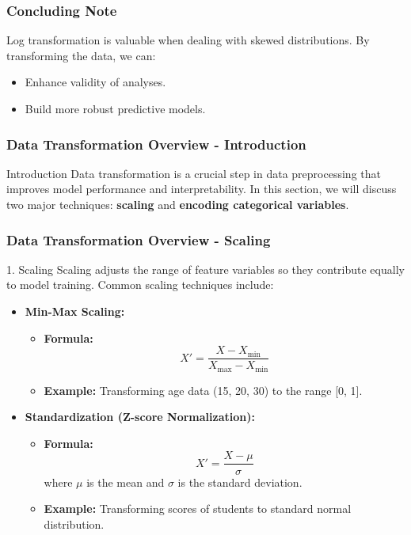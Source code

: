 \documentclass[aspectratio=169]{beamer}
\begin{document}
\begin{frame}[fragile]
  \frametitle{Concluding Note}
  Log transformation is valuable when dealing with skewed distributions. By transforming the data, we can:
  \begin{itemize}
    \item Enhance validity of analyses.
    \item Build more robust predictive models.
  \end{itemize}
\end{frame}

\begin{frame}[fragile]
    \frametitle{Data Transformation Overview - Introduction}
    \begin{block}{Introduction}
        Data transformation is a crucial step in data preprocessing that improves model performance and interpretability. In this section, we will discuss two major techniques: \textbf{scaling} and \textbf{encoding categorical variables}.
    \end{block}
\end{frame}

\begin{frame}[fragile]
    \frametitle{Data Transformation Overview - Scaling}
    \begin{block}{1. Scaling}
        Scaling adjusts the range of feature variables so they contribute equally to model training. Common scaling techniques include:
    \end{block}
    \begin{itemize}
        \item \textbf{Min-Max Scaling:}
        \begin{itemize}
            \item \textbf{Formula:}
            \[
            X' = \frac{X - X_{\text{min}}}{X_{\text{max}} - X_{\text{min}}}
            \]
            \item \textbf{Example:} Transforming age data (15, 20, 30) to the range [0, 1].
        \end{itemize}
        
        \item \textbf{Standardization (Z-score Normalization):}
        \begin{itemize}
            \item \textbf{Formula:}
            \[
            X' = \frac{X - \mu}{\sigma}
            \]
            where $\mu$ is the mean and $\sigma$ is the standard deviation.
            \item \textbf{Example:} Transforming scores of students to standard normal distribution.
        \end{itemize}
    \end{itemize}
\end{frame}
\end{document}
